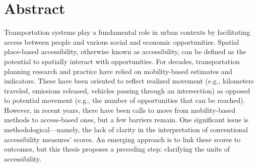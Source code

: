 \documentclass[
11pt, %
oneside, %
english, %
singlespacing, %
]{macthesis} %
\begin{document}
\section*{\Huge Abstract}
\addchaptertocentry{\abstractname}
Transportation systems play a fundamental role in urban contexts by facilitating access between people and various social and economic opportunities. Spatial place-based accessibility, otherwise known as accessibility, can be defined as the potential to spatially interact with opportunities. For decades, transportation planning research and practice have relied on mobility-based estimates and indicators. These have been oriented to reflect realized movement (e.g., kilometers traveled, emissions released, vehicles passing through an intersection) as opposed to potential movement (e.g., the number of opportunities that can be reached). However, in recent years, there have been calls to move from mobility-based methods to access-based ones, but a few barriers remain. One significant issue is methodological---namely, the lack of clarity in the interpretation of conventional accessibility measures' scores. An emerging approach is to link these scores to outcomes, but this thesis proposes a preceding step: clarifying the units of accessibility.
\end{document}
